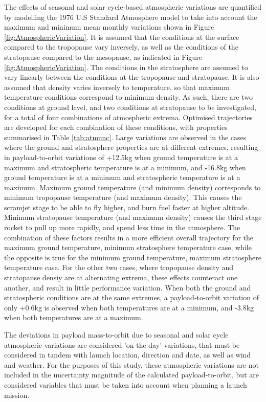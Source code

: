 


The effects of seasonal and solar cycle-based atmospheric variations are quantified by modelling the 1976 U.S Standard Atmosphere model to take into account the maximum and minimum mean monthly variations shown in Figure \ref{fig:AtmosphericVariation}. It is assumed that the conditions at the surface compared to the tropopause vary inversely, as well as the conditions of the stratopause compared to the mesopause, as indicated in Figure \ref{fig:AtmosphericVariation}. The conditions in the stratosphere are assumed to vary linearly between the conditions at the tropopause and stratopause. It is also assumed that density varies inversely to temperature, so that maximum temperature conditions correspond to minimum density. As such, there are two conditions at ground level, and two conditions at stratopause to be investigated, for a total of four combinations of atmospheric extrema. Optimised trajectories are developed for each combination of these conditions, with properties summarised in Table \ref{tab:atmunc}. Large variations are observed in the cases where the ground and stratosphere properties are at different extremes, resulting in payload-to-orbit variations of +12.5kg when ground temperature is at a maximum and stratospheric temperature is at a minimum, and -16.8kg when ground temperature is at a minimum and stratospheric temperature is at a maximum. Maximum ground temperature (and minimum density) corresponds to minimum tropopause temperature (and maximum density). This causes the scramjet stage to be able to fly higher, and burn fuel faster at higher altitude. Minimum stratopause temperature (and maximum density) causes the third stage rocket to pull up more rapidly, and spend less time in the atmosphere. The combination of these factors results in a more efficient overall trajectory for the maximum ground temperature, minimum stratosphere temperature case, while the opposite is true for the minimum ground temperature, maximum stratosphere temperature case. For the other two cases, where tropopause density and stratopause densiy are at alternating extrema, these effects counteract one another, and result in little performance variation. 
When both the ground and stratospheric conditions are at the same extremes, a payload-to-orbit variation of only +0.6kg is observed when both temperatures are at a minimum, and -3.8kg when both temperatures are at a maximum.

The deviations in payload mass-to-orbit due to seasonal and solar cycle atmospheric variations are considered 'on-the-day' variations, that must be considered in tandem with launch location, direction and date, as well as wind and weather. For the purposes of this study, these atmospheric variations are not included in the uncertainty magnitude of the calculated payload-to-orbit, but are considered variables that must be taken into account when planning a launch mission. 


